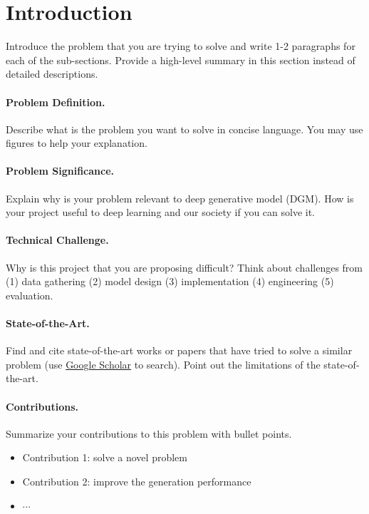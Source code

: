 \documentclass{article}
\begin{document}
\section{Introduction}
Introduce the problem that you are trying to solve and write 1-2 paragraphs for each of the sub-sections. Provide a high-level summary in this section instead of detailed descriptions.

\paragraph{Problem Definition.}
Describe  what is the problem you want to solve in concise language. You may use figures to help your explanation.


\paragraph{Problem Significance.}
Explain  why is your problem relevant to deep generative model (DGM). How is your project useful to deep learning and our society if you can solve it. 

\paragraph{Technical Challenge.}
Why is this project that you are proposing difficult? Think about challenges from (1) data gathering (2) model design (3) implementation (4) engineering (5) evaluation. 

\paragraph{State-of-the-Art.}
Find and cite state-of-the-art works or papers that have tried to solve a similar problem (use \href{https://scholar.google.com/}{Google Scholar} to search). Point out the limitations of the state-of-the-art.

\paragraph{Contributions.}
Summarize your contributions to this problem with bullet points. 
\begin{itemize}
    \item Contribution 1: solve a novel problem
    \item Contribution 2: improve the generation performance
    \item $\cdots$
\end{itemize}
\end{document}
